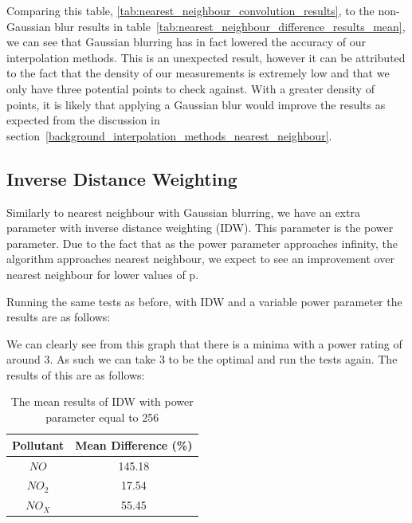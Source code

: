 			Comparing this table, \ref{tab:nearest_neighbour_convolution_results}, to the non-Gaussian blur results in table~\ref{tab:nearest_neighbour_difference_results_mean}, we can see that Gaussian blurring has in fact lowered the accuracy of our interpolation methods. This is an unexpected result, however it can be attributed to the fact that the density of our measurements is extremely low and that we only have three potential points to check against. With a greater density of points, it is likely that applying a Gaussian blur would improve the results as expected from the discussion in section~\ref{background_interpolation_methods_nearest_neighbour}.


        \subsection{Inverse Distance Weighting}\label{prediction_evaluation_results_inverse_distance_weighting}

        	Similarly to nearest neighbour with Gaussian blurring, we have an extra parameter with inverse distance weighting (IDW). This parameter is the power parameter. Due to the fact that as the power parameter approaches infinity, the algorithm approaches nearest neighbour, we expect to see an improvement over nearest neighbour for lower values of p.

        	Running the same tests as before, with IDW and a variable power parameter the results are as follows:


        	We can clearly see from this graph that there is a minima with a power rating of around 3. As such we can take 3 to be the optimal and run the tests again. The results of this are as follows:

        	\begin{table}[H]
				\centering
	    		\begin{tabular}{|c|c|}
	    			\hline
					Pollutant & Mean Difference (\%) \\ \hline
					$NO$ & 145.18 \\
					$NO_{2}$ & 17.54 \\
					$NO_{X}$ & 55.45 \\
					\hline
				\end{tabular}
				\caption{The mean results of IDW with power parameter equal to 256}
				\label{tab:idw_results}
			\end{table} 

